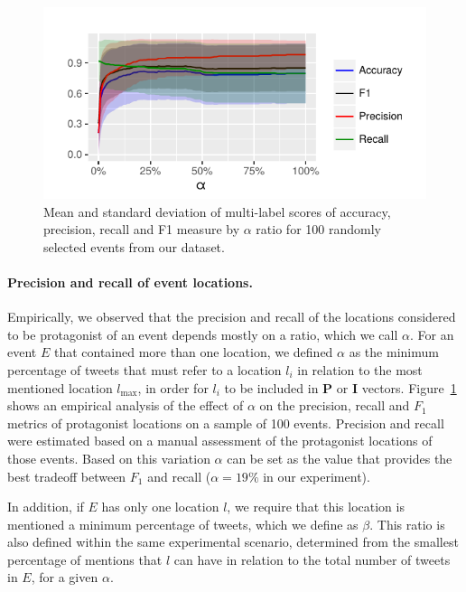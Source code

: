 \begin{figure}[h]
  \centering
  \includegraphics[width=\textwidth]{figures/geopolitical/k_accuracy_recall.pdf}
  \caption{Mean and standard deviation of multi-label scores of accuracy,
  precision, recall and F1 measure by $\alpha$ ratio for 100 randomly selected
  events from our dataset.}
  \label{fig:eval}
\end{figure}

\medskip
\paragraph{Precision and recall of event locations.}
%
Empirically, we observed that the precision and recall of the locations
considered to be protagonist of an event depends mostly on a ratio, which we
call $\alpha$.
%
For an event $E$ that contained more than one location, we defined $\alpha$ as
the minimum percentage of tweets that must refer to a location $l_i$ in relation
to the most mentioned location $l_{\mathrm{max}}$, in order for $l_i$ to be
included in $\mathbf{P}$ or $\mathbf{I}$ vectors.
%
Figure~\ref{fig:eval} shows an empirical analysis of the effect of $\alpha$ on
the precision, recall and $F_1$ metrics of protagonist locations on a sample of
100 events.  
%
Precision and recall were estimated based on a manual assessment of the
protagonist locations of those events. 
%
Based on this variation $\alpha$ can be set as the value that provides the best
tradeoff between $F_1$ and recall ($\alpha = 19\%$ in our experiment).

In addition, if $E$ has only one location $l$, we require that this location is
mentioned a minimum percentage of tweets, which we define as $\beta$. This ratio
is also defined within the same experimental scenario, determined from the
smallest percentage of mentions that $l$ can have in relation to the total
number of tweets in $E$, for a given $\alpha$.



